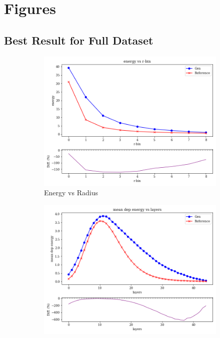 
\chapter{Figures} %

\label{AppendixA} %

% 
%

\section{Best Result for Full Dataset}


\begin{figure}[htbp]
    \centering
    \begin{subfigure}[b]{0.23\textwidth}
        \centering
        \includegraphics[width=\textwidth]{Figures/a1_2.png}
        \caption{Energy vs Radius}
        \label{fig:a1-2}
    \end{subfigure}
    \hfill
    \begin{subfigure}[b]{0.23\textwidth}
        \centering
        \includegraphics[width=\textwidth]{Figures/a1_3.png}

\end{subfigure}
\end{figure}
